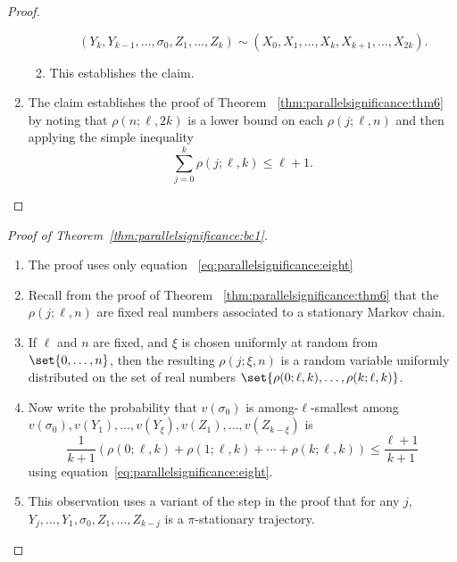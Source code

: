 \documentclass[12pt]{article}
\begin{document}
\begin{proof}
\begin{enumerate}
\begin{enumerate}
                    \[
                        (Y_k, Y_{k-1}, \dots, \sigma_0, Z_1, \dots, Z_k)
                        \sim (X_0, X_1, \dots, X_k, X_{k+1}, \dots, X_{2k}).
                    \]
                \item
                    This establishes the claim.
            \end{enumerate}
        \item
            The claim establishes the proof of Theorem~%
            \ref{thm:parallelsignificance:thm6} by noting that \( \rho(n; \ell,
            2k) \) is a lower bound on each \( \rho(j; \ell, n) \) and
            then applying the simple inequality
            \begin{equation}
                \label{eq:parallelsignificance:eight} \sum\limits_{j=0}^k \rho(j;
                \ell, k) \le \ell + 1.
            \end{equation}
    \end{enumerate}
\end{proof}

\begin{proof}[Proof of Theorem~\ref{thm:parallelsignificance:bc1}]
    \begin{enumerate}
        \item
            The proof uses only equation~%
            \eqref{eq:parallelsignificance:eight}
        \item
            Recall from the proof of Theorem~%
            \ref{thm:parallelsignificance:thm6} that the \( \rho(j; \ell, n) \)
            are fixed real numbers associated to a stationary Markov
            chain.
        \item
            If \( \ell \) and \( n \) are fixed, and \( \xi \) is chosen
            uniformly at random from \( \set{0, \dots, n} \), then the
            resulting \( \rho(j; \xi, n) \) is a random variable
            uniformly distributed on the set of real numbers \( \set{\rho
            (0; \ell, k), \dots, \rho(k; \ell, k)} \).
        \item
            Now write the probability that \( v(\sigma_0) \) is among-\(
            \ell \)-smallest among \( v(\sigma_0), v(Y_1), \dots, v(Y_{\xi}),
            v(Z_1), \dots, v(Z_ {k-\xi}) \) is
            \[
                \frac{1}{k+1} (\rho(0; \ell, k)+ \rho(1; \ell, k) +
                \cdots + \rho(k; \ell, k) ) \le \frac{\ell + 1}{k + 1}
            \] using equation~\eqref{eq:parallelsignificance:eight}.
        \item
            This observation uses a variant of the step in the proof
            that for any \( j \), \( Y_j, \dots, Y_1, \sigma_0, Z_1,
            \dots, Z_{k-j} \) is a \( \pi \)-stationary trajectory.
    \end{enumerate}
\end{proof}
\end{document}
